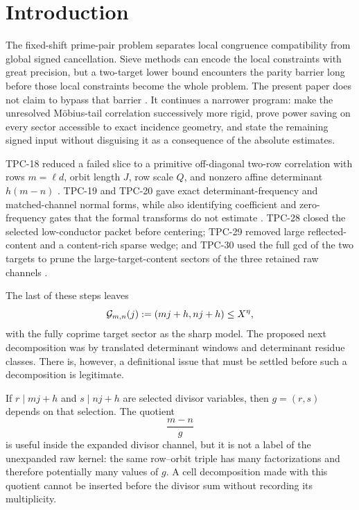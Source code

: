\section{Introduction}
\label{sec:tpc31-introduction}

The fixed-shift prime-pair problem separates local congruence
compatibility from global signed cancellation.  Sieve methods can
encode the local constraints with great precision, but a two-target
lower bound encounters the parity barrier long before those local
constraints become the whole problem.  The present paper does not
claim to bypass that barrier \citep{HeathBrown1982Parity}.  It continues a narrower program: make
the unresolved M\"obius-tail correlation successively more rigid,
prove power saving on every sector accessible to exact incidence
geometry, and state the remaining signed input without disguising it
as a consequence of the absolute estimates.

TPC-18 reduced a failed slice to a primitive off-diagonal two-row
correlation with rows $m=\ell d$, orbit length $J$, row scale $Q$, and
nonzero affine determinant $h(m-n)$ \citep{WangTPC18}.  TPC-19 and
TPC-20 gave exact determinant-frequency and matched-channel normal
forms, while also identifying coefficient and zero-frequency gates
that the formal transforms do not estimate \citep{WangTPC19,WangTPC20}.
TPC-28 closed the selected low-conductor packet before centering;
TPC-29 removed large reflected-content and a content-rich sparse
wedge; and TPC-30 used the full gcd of the two targets to prune the
large-target-content sectors of the three retained raw channels
\citep{WangTPC28,WangTPC29,WangTPC30}.

The last of these steps leaves
\begin{equation}
 \mathcal G_{m,n}(j):=(mj+h,nj+h)\le X^\eta,
 \label{eq:tpc31-intro-small-content}
\end{equation}
with the fully coprime target sector as the sharp model.  The proposed
next decomposition was by translated determinant windows and
determinant residue classes.  There is, however, a definitional issue
that must be settled before such a decomposition is legitimate.

If $r\mid mj+h$ and $s\mid nj+h$ are selected divisor variables, then
$g=(r,s)$ depends on that selection.  The quotient
\[
 \frac{m-n}{g}
\]
is useful inside the expanded divisor channel, but it is not a label
of the unexpanded raw kernel: the same row--orbit triple has many
factorizations and therefore potentially many values of $g$.  A
cell decomposition made with this quotient cannot be inserted before
the divisor sum without recording its multiplicity.

